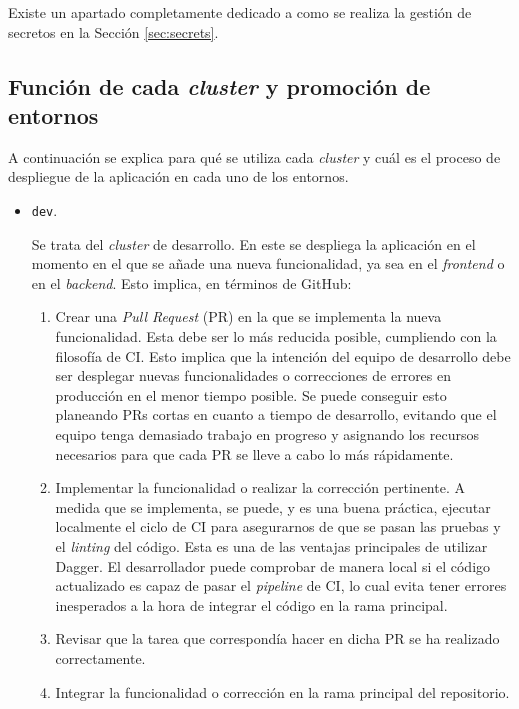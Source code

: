 Existe un apartado completamente dedicado a como se realiza la gestión de secretos en la Sección \ref{sec:secrets}. 

\subsection*{Función de cada \textit{cluster} y promoción de entornos}
\label{subsec:cluster-func}

A continuación se explica para qué se utiliza cada \textit{cluster} y cuál es el proceso de despliegue de la aplicación en cada uno de los entornos.

\begin{itemize}
  \item \texttt{dev}.

    Se trata del \textit{cluster} de desarrollo. En este se despliega la aplicación en el momento en el que se añade una nueva funcionalidad, ya sea en el \textit{frontend} o en el \textit{backend}. Esto implica, en términos de GitHub:

    \begin{enumerate}
      \item Crear una \textit{Pull Request} (PR) en la que se implementa la nueva funcionalidad. Esta debe ser lo más reducida posible, cumpliendo con la filosofía de CI. Esto implica que la intención del equipo de desarrollo debe ser desplegar nuevas funcionalidades o correcciones de errores en producción en el menor tiempo posible. Se puede conseguir esto planeando PRs cortas en cuanto a tiempo de desarrollo, evitando que el equipo tenga demasiado trabajo en progreso y asignando los recursos necesarios para que cada PR se lleve a cabo lo más rápidamente\cite{linear}.
      \item Implementar la funcionalidad o realizar la corrección pertinente. A medida que se implementa, se puede, y es una buena práctica, ejecutar localmente el ciclo de CI para asegurarnos de que se pasan las pruebas y el \textit{linting} del código. Esta es una de las ventajas principales de utilizar Dagger. El desarrollador puede comprobar de manera local si el código actualizado es capaz de pasar el \textit{pipeline} de CI, lo cual evita tener errores inesperados a la hora de integrar el código en la rama principal.
      \item Revisar que la tarea que correspondía hacer en dicha PR se ha realizado correctamente.
      \item Integrar la funcionalidad o corrección en la rama principal del repositorio.
    \end{enumerate}


\end{itemize}
